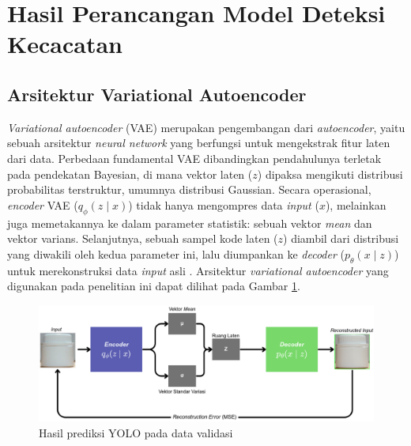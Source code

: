 \vspace{1em}

\section{Hasil Perancangan Model Deteksi Kecacatan}
\subsection{Arsitektur Variational Autoencoder}
\textit{Variational autoencoder} (VAE) merupakan pengembangan dari
\textit{autoencoder}, yaitu sebuah arsitektur \textit{neural network}
yang berfungsi untuk mengekstrak fitur laten dari data. Perbedaan
fundamental VAE dibandingkan pendahulunya terletak pada pendekatan
Bayesian, di mana vektor laten ($z$) dipaksa mengikuti distribusi
probabilitas terstruktur, umumnya distribusi Gaussian. Secara
operasional, \textit{encoder} VAE ($q_{\phi}(z \mid x)$) tidak hanya
mengompres data \textit{input} ($x$), melainkan juga memetakannya
ke dalam parameter statistik: sebuah vektor \textit{mean} dan
vektor varians. Selanjutnya, sebuah sampel kode laten ($z$) diambil
dari distribusi yang diwakili oleh kedua parameter ini, lalu diumpankan
ke \textit{decoder} ($p_{\theta}(x \mid z)$) untuk merekonstruksi
data \textit{input}
asli \citep{25}. Arsitektur \textit{variational autoencoder} yang digunakan pada
penelitian ini dapat dilihat pada Gambar \ref{fig:arsitektur-autoencoder}.

\begin{figure}[H]
  \centering
  \includegraphics[width=\textwidth]{gambar/arsitektur_autoencoder.png}
  \caption{Hasil prediksi YOLO pada data validasi}
  \label{fig:arsitektur-autoencoder}
\end{figure}
\vspace{-1em}

